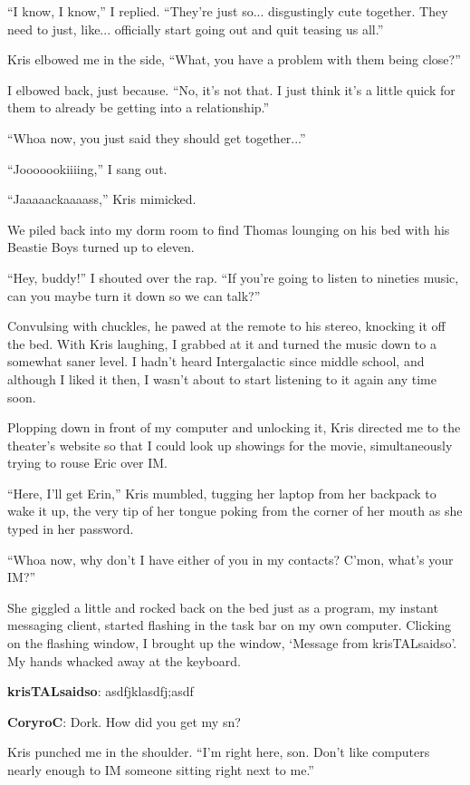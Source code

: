 ``I know, I know,'' I replied.  ``They're just so... disgustingly cute together.  They need to just, like... officially start going out and quit teasing us all.''

Kris elbowed me in the side, ``What, you have a problem with them being close?''

I elbowed back, just because.  ``No, it's not that.  I just think it's a little quick for them to already be getting into a relationship.''

``Whoa now, you just said they should get together...''

``Jooooookiiiing,'' I sang out.

``Jaaaaackaaaass,'' Kris mimicked.

We piled back into my dorm room to find Thomas lounging on his bed with his Beastie Boys turned up to eleven.

``Hey, buddy!'' I shouted over the rap.  ``If you're going to listen to nineties music, can you maybe turn it down so we can talk?''

Convulsing with chuckles, he pawed at the remote to his stereo, knocking it off the bed.  With Kris laughing, I grabbed at it and turned the music down to a somewhat saner level.  I hadn't heard Intergalactic since middle school, and although I liked it then, I wasn't about to start listening to it again any time soon.

Plopping down in front of my computer and unlocking it, Kris directed me to the theater's website so that I could look up showings for the movie, simultaneously trying to rouse Eric over IM.

``Here, I'll get Erin,'' Kris mumbled, tugging her laptop from her backpack to wake it up, the very tip of her tongue poking from the corner of her mouth as she typed in her password.

``Whoa now, why don't I have either of you in my contacts?  C'mon, what's your IM?''

She giggled a little and rocked back on the bed just as a program, my instant messaging client, started flashing in the task bar on my own computer.  Clicking on the flashing window, I brought up the window, `Message from krisTALsaidso'.  My hands whacked away at the keyboard.\vspace{1em}

\textbf{\color{red}krisTALsaidso}: asdfjklasdfj;asdf

\textbf{\color{blue}CoryroC}: Dork.  How did you get my sn?

\vspace{1em}Kris punched me in the shoulder.  ``I'm right here, son.  Don't like computers nearly enough to IM someone sitting right next to me.''

